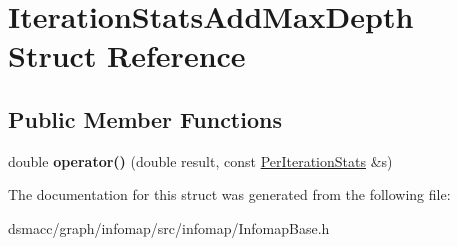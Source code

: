 \hypertarget{structIterationStatsAddMaxDepth}{}\section{Iteration\+Stats\+Add\+Max\+Depth Struct Reference}
\label{structIterationStatsAddMaxDepth}
\subsection*{Public Member Functions}
\begin{DoxyCompactItemize}
\item 
\mbox{\label{structIterationStatsAddMaxDepth_a064106169249a1543c75662d67cc44c8}} 
double {\bfseries operator()} (double result, const \mbox{\hyperlink{structPerIterationStats}{Per\+Iteration\+Stats}} \&s)
\end{DoxyCompactItemize}


The documentation for this struct was generated from the following file\+:\begin{DoxyCompactItemize}
\item 
dsmacc/graph/infomap/src/infomap/Infomap\+Base.\+h\end{DoxyCompactItemize}
